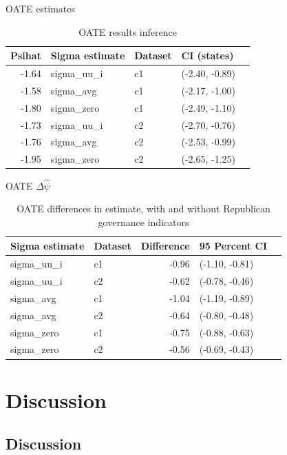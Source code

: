 \documentclass[hyperref={pdfpagelabels=false}]{beamer}
\begin{document}
\begin{frame}{OATE estimates}
\begin{table}[ht]
\centering
\begin{tabular}{rllll}
  \toprule
Psihat & Sigma estimate & Dataset & CI (states) \\ 
  \midrule
  -1.64 & sigma\_uu\_i & c1 & (-2.40, -0.89) \\ 
  -1.58 & sigma\_avg & c1 & (-2.17, -1.00) \\ 
  -1.80 & sigma\_zero & c1 & (-2.49, -1.10) \\ 
  -1.73 & sigma\_uu\_i & c2 & (-2.70, -0.76) \\ 
  -1.76 & sigma\_avg & c2 & (-2.53, -0.99) \\ 
  -1.95 & sigma\_zero & c2 & (-2.65, -1.25) \\ 
   \bottomrule
\end{tabular}
\caption{OATE results inference}
\label{tab:oateconfint}
\end{table}
\end{frame}

\begin{frame}{OATE $\Delta\hat{\psi}$}
\begin{table}[ht]
\centering
\begin{tabular}{llrll}
  \toprule
Sigma estimate & Dataset & Difference & 95 Percent CI\\ 
  \midrule
  sigma\_uu\_i & c1 & -0.96 & (-1.10, -0.81) \\ 
  sigma\_uu\_i & c2 & -0.62 & (-0.78, -0.46) \\ 
  sigma\_avg & c1 & -1.04 & (-1.19, -0.89) \\ 
  sigma\_avg & c2 & -0.64 & (-0.80, -0.48) \\ 
  sigma\_zero & c1 & -0.75 & (-0.88, -0.63) \\ 
  sigma\_zero & c2 & -0.56 & (-0.69, -0.43) \\ 
   \bottomrule
\end{tabular}
\caption{OATE differences in estimate, with and without Republican governance indicators}
\label{tab:oaterepubdiff}
\end{table}
\end{frame}

\section{Discussion}

\subsection{Discussion}
\end{document}
